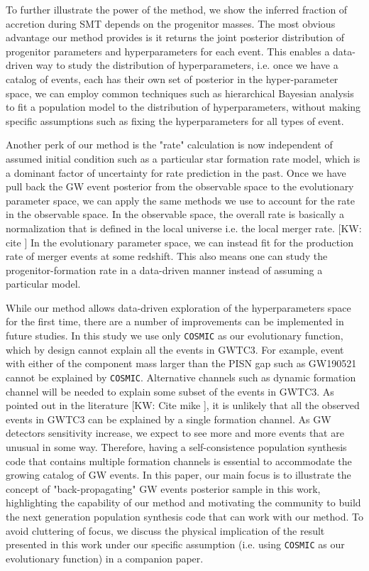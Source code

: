 \documentclass[twocolumn]{aastex631}
\newcommand{\kw}[1]{{\color{rb4}[KW: #1 ]}}
\begin{document}
To further illustrate the power of the method, we show the inferred fraction of accretion during SMT depends on the progenitor masses.
The most obvious advantage our method provides is it returns the joint posterior distribution of progenitor parameters and hyperparameters for each event.
This enables a data-driven way to study the distribution of hyperparameters,
i.e. once we have a catalog of events, each has their own set of posterior in the hyper-parameter space,
we can employ common techniques such as hierarchical Bayesian analysis to fit a population model to the distribution of hyperparameters,
without making specific assumptions such as fixing the hyperparameters for all types of event.

Another perk of our method is the "rate" calculation is now independent of assumed initial condition such as a particular star formation rate model,
which is a dominant factor of uncertainty for rate prediction in the past.
Once we have pull back the GW event posterior from the observable space to the evolutionary parameter space,
we can apply the same methods we use to account for the rate in the observable space.
In the observable space, the overall rate is basically a normalization that is defined in the local universe i.e. the local merger rate. \kw{cite}
In the evolutionary parameter space, we can instead fit for the production rate of merger events at some redshift.
This also means one can study the progenitor-formation rate in a data-driven manner instead of assuming a particular model.


While our method allows data-driven exploration of the hyperparameters space for the first time, there are a number of improvements can be implemented in future studies.
In this study we use only \texttt{COSMIC} as our evolutionary function, which by design cannot explain all the events in GWTC3.
For example, event with either of the component mass larger than the PISN gap such as GW190521 cannot be explained by \texttt{COSMIC}.
Alternative channels such as dynamic formation channel will be needed to explain some subset of the events in GWTC3.
As pointed out in the literature \kw{Cite mike}, it is unlikely that all the observed events in GWTC3 can be explained by a single formation channel.
As GW detectors sensitivity increase, we expect to see more and more events that are unusual in some way.
Therefore, having a self-consistence population synthesis code that contains multiple formation channels is essential to accommodate the growing catalog of GW events.
In this paper, our main focus is to illustrate the concept of "back-propagating" GW events posterior sample in this work,
highlighting the capability of our method and motivating the community to build the next generation population synthesis code that can work with our method.
To avoid cluttering of focus, we discuss the physical implication of the result presented in this work under our specific assumption (i.e. using \texttt{COSMIC} as our evolutionary function) in a companion paper.
\end{document}
